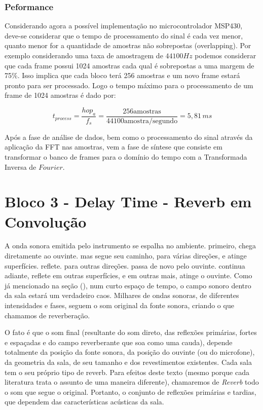 			\subsubsection{Peformance}
			
				Considerando agora a possível implementação no microcontrolador MSP430, deve-se considerar que o tempo de processamento do sinal é cada vez menor, quanto menor for a quantidade de amostras não sobrepostas (overlapping). Por exemplo considerando uma taxa de amostragem de $ 44100 Hz $ podemos considerar que cada frame possui 1024 amostras cada qual é sobrepostas a uma margem de 75\%. Isso implica que cada bloco terá 256 amostras e um novo frame estará pronto para ser processado. Logo o tempo máximo para o processamento de um frame de 1024 amostras é dado por:
				
				\begin{equation}
					t_{process} = \frac{hop_a}{f_s} = \frac{256 \text{amostras}}{44100 \text{amostra/segundo}} = 5,81\,ms
				\end{equation}
				
				Após a fase de análise de dados, bem como o processamento do sinal através da aplicação da FFT nas amostras, vem a fase de síntese que consiste em transformar o banco de frames para o domínio do tempo com a Transformada Inversa de $ Fourier $. 
					
		
\section{Bloco 3 - Delay Time - Reverb em Convolução}
		
		A onda sonora emitida pelo instrumento se espalha no ambiente. primeiro, chega diretamente ao ouvinte. mas segue seu caminho, para várias direções, e atinge superfícies. reflete. para outras direções. passa de novo pelo ouvinte. continua adiante, reflete em outras superfícies, e em outras mais, atinge o ouvinte. Como já mencionado na seção (), num curto espaço de tempo, o campo sonoro dentro da sala estará um verdadeiro caos. Milhares de ondas sonoras, de diferentes intensidades e fases, seguem o som original da fonte sonora, criando o que chamamos de reverberação.
		
		O fato é que o som final (resultante do som direto, das reflexões primárias, fortes e espaçadas e do campo reverberante que soa como uma cauda), depende totalmente da posição da fonte sonora, da posição do ouvinte (ou do microfone), da geometria da sala, de seu tamanho e dos revestimentos existentes. Cada sala tem o seu próprio tipo de reverb. Para efeitos deste texto (mesmo porque cada literatura trata o assunto de uma maneira diferente), chamaremos de \textit{Reverb} todo o som que segue o original. Portanto, o conjunto de reflexões primárias e tardias, que dependem das características acústicas da sala.
		
